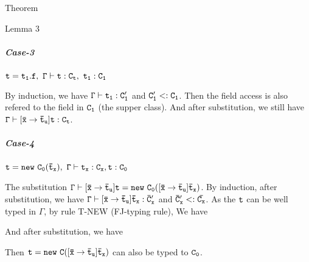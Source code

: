 \documentclass[GBK,winfonts,a4paper,11pt]{article}
\begin{document}
\begin{section}{Theorem}
\begin{subsection}{Lemma 3}
\subparagraph{Case-3}$\tt t=t_1.f,\ \Gamma\vdash t:C_t,\ t_1:C_1$
\par
By induction, we have $\tt \Gamma\vdash t_1:C'_1$ and $\tt C'_1 <: C_1$. 
Then the field access is also refered to the field in $\tt C_1$ (the supper class). And after substitution, we still have $\tt \Gamma\vdash [\bar{x}\rightarrow\bar{t}_u]t:C_t$.

\subparagraph{Case-4} $\tt t=new\ C_0(\bar{t}_x),\ \Gamma\vdash t_x:C_x, t:C_0$
\par
The substitution $\tt\Gamma \vdash [\bar{x}\rightarrow\bar{t}_u]t = new\ C_0([\bar{x}\rightarrow\bar{t}_u]\bar{t}_x)$.
By induction, after substitution, we have $\tt \Gamma\vdash [\bar{x}\rightarrow\bar{t}_u]\bar{t}_x:\bar{C}'_x$ and $\tt \bar{C}'_x<:\bar{C_x}$. 
As the $\tt t$ can be well typed in $\Gamma$, by rule T-NEW (FJ-typing rule), 
We have 
\begin{center}
\DP
\end{center}
And after substitution, we have 
\begin{center}
\DP
\end{center}
Then $\tt t=new\ C([\bar{x}\rightarrow\bar{t}_u]\bar{t}_x)$ can also be typed to $\tt C_0$.


\end{subsection}
\end{section}
\end{document}

